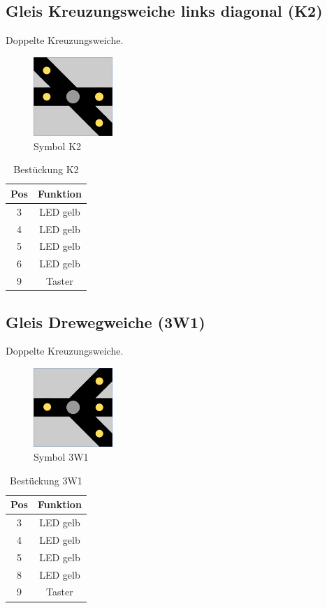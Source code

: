 \documentclass[10pt,a4paper]{article}
\begin{document}
\subsection{Gleis Kreuzungsweiche links diagonal (K2)}
Doppelte Kreuzungsweiche.
\begin{figure}[hbtp]
\centering
\includegraphics[width=3cm]{../folien/k2.png}
\caption{Symbol K2}
\end{figure}
\begin{table}[h!]
\centering
\begin{tabular}{c|c}
\textbf{Pos} & \textbf{Funktion} \\ \hline
3 & LED gelb \\
4 & LED gelb \\
5 & LED gelb \\
6 & LED gelb \\
9 & Taster
\end{tabular}
\caption{Bestückung K2}
\end{table}


\subsection{Gleis Drewegweiche (3W1)}
Doppelte Kreuzungsweiche.
\begin{figure}[hbtp]
\centering
\includegraphics[width=3cm]{../folien/3w1.png}
\caption{Symbol 3W1}
\end{figure}
\begin{table}[h!]
\centering
\begin{tabular}{c|c}
\textbf{Pos} & \textbf{Funktion} \\ \hline
3 & LED gelb \\
4 & LED gelb \\
5 & LED gelb \\
8 & LED gelb \\
9 & Taster
\end{tabular}
\caption{Bestückung 3W1}
\end{table}
\end{document}
